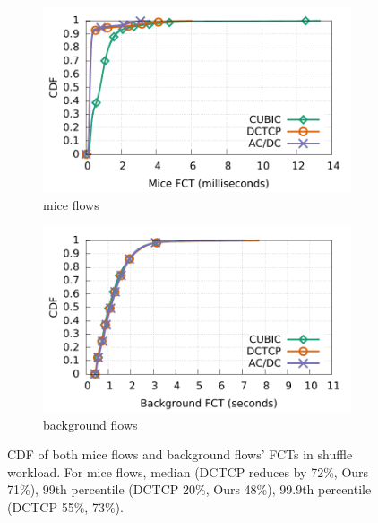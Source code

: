 \begin{figure}[t]
        \centering
        \begin{subfigure}[b]{0.45\textwidth}
                \centering
                \includegraphics[width=\textwidth]{figures/macro_benchmarks/shuffle_17hosts/shuffle_mice16KB_fct.pdf}
                \caption{mice flows}
                \label{macro_shuffle_mice_fct}
        \end{subfigure}
        \begin{subfigure}[b]{0.45\textwidth}
                \centering
                \includegraphics[width=\textwidth]{figures/macro_benchmarks/shuffle_17hosts/shuffle_big512MB_fct.pdf}
                \caption{background flows}
                \label{macro_shuffle_background_fct}
        \end{subfigure}
        \caption{CDF of both mice flows and background flows' FCTs in shuffle workload.
                For mice flows, median (DCTCP reduces by 72\%, Ours 71\%),
                99th percentile (DCTCP 20\%, Ours 48\%),
                99.9th percentile (DCTCP 55\%, 73\%).}
        \label{macro_shuffle_fct}
\end{figure}

